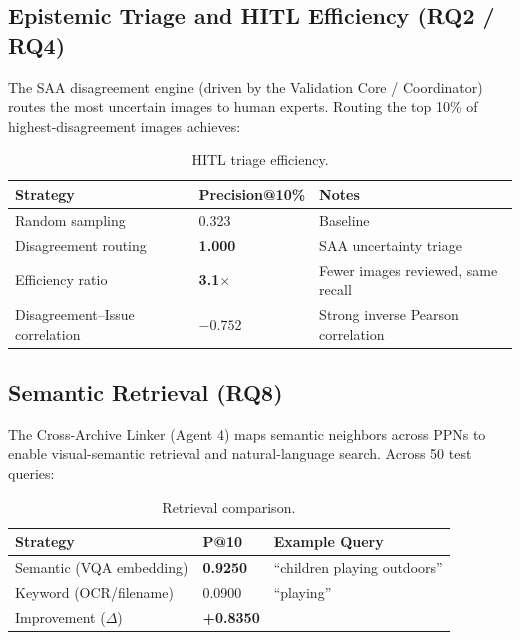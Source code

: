\documentclass[11pt,a4paper]{article}
\theoremstyle{plain}
\begin{document}
\subsection{Epistemic Triage and HITL Efficiency (RQ2 / RQ4)}

The SAA disagreement engine (driven by the Validation Core / Coordinator) routes the most uncertain images to human experts. Routing the top 10\% of highest-disagreement images achieves:

\begin{table}[h]
\centering
\caption{HITL triage efficiency.}
\renewcommand{\arraystretch}{1.25}
\begin{tabular}{lll}
\toprule
\textbf{Strategy} & \textbf{Precision@10\%} & \textbf{Notes} \\
\midrule
Random sampling       & 0.323  & Baseline \\
Disagreement routing  & \textbf{1.000}  & SAA uncertainty triage \\
Efficiency ratio      & \textbf{3.1$\times$} & Fewer images reviewed, same recall \\
Disagreement--Issue correlation & $-0.752$ & Strong inverse Pearson correlation \\
\bottomrule
\end{tabular}
\end{table}

\subsection{Semantic Retrieval (RQ8)}

The Cross-Archive Linker (Agent 4) maps semantic neighbors across PPNs to enable visual-semantic retrieval and natural-language search. Across 50 test queries:

\begin{table}[h]
\centering
\caption{Retrieval comparison.}
\renewcommand{\arraystretch}{1.25}
\begin{tabular}{lll}
\toprule
\textbf{Strategy} & \textbf{P@10} & \textbf{Example Query} \\
\midrule
Semantic (VQA embedding) & \textbf{0.9250} & ``children playing outdoors'' \\
Keyword (OCR/filename)   & 0.0900 & ``playing'' \\
Improvement ($\Delta$)   & \textbf{+0.8350} & \\
\bottomrule
\end{tabular}
\end{table}
\end{document}
